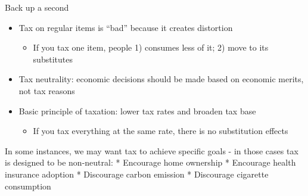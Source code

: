 \documentclass[
  ignorenonframetext,
]{beamer}
\providecommand{\tightlist}{%
  \setlength{\itemsep}{0pt}\setlength{\parskip}{0pt}}
\begin{document}
\begin{frame}{Back up a second}
\protect\hypertarget{back-up-a-second}{}
\begin{itemize}
\tightlist
\item
  Tax on regular items is ``bad'' because it creates distortion

  \begin{itemize}
  \tightlist
  \item
    If you tax one item, people 1) consumes less of it; 2) move to its
    substitutes
  \end{itemize}
\item
  Tax neutrality: economic decisions should be made based on economic
  merits, not tax reasons
\item
  Basic principle of taxation: lower tax rates and broaden tax base

  \begin{itemize}
  \tightlist
  \item
    If you tax everything at the same rate, there is no substitution
    effects
  \end{itemize}
\end{itemize}
\end{frame}

\begin{frame}{}
\protect\hypertarget{section-18}{}
In some instances, we may want tax to achieve specific goals - in those
cases tax is designed to be non-neutral: * Encourage home ownership *
Encourage health insurance adoption * Discourage carbon emission *
Discourage cigarette consumption
\end{frame}

\begin{frame}{}
\protect\hypertarget{section-19}{}
\end{frame}
\end{document}
